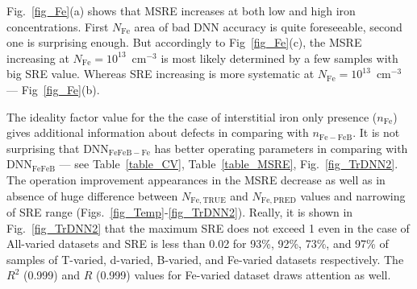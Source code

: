 \documentclass[a4paper,fleqn]{cas-sc}
\begin{document}
Fig.~\ref{fig_Fe}(a) shows that MSRE increases at both low and high iron concentrations.
First $N_\mathrm{Fe}$ area of bad DNN accuracy is quite foreseeable,
second one is surprising enough.
But accordingly to Fig~\ref{fig_Fe}(c), the MSRE increasing at $N_\mathrm{Fe}=10^{13}$~cm$^{-3}$ is most likely determined by  a few samples with big SRE value.
Whereas SRE increasing is more systematic at $N_\mathrm{Fe}=10^{13}$~cm$^{-3}$ --- Fig~\ref{fig_Fe}(b).

The ideality factor value for the the case of interstitial iron only presence ($n_\mathrm{Fe}$)
gives additional information about defects in comparing with $n_\mathrm{Fe-FeB}$.
It is not surprising that DNN$_\mathrm{FeFeB-Fe}$ has better operating parameters in comparing with
DNN$_\mathrm{FeFeB}$ --- see Table~\ref{table_CV}, Table~\ref{table_MSRE}, Fig.~\ref{fig_TrDNN2}.
The operation improvement appearances in the MSRE decrease as well as in
absence of huge difference between $N_\mathrm{Fe,TRUE}$ and $N_\mathrm{Fe,PRED}$ values
and narrowing of SRE range (Figs.~\ref{fig_Temp}-\ref{fig_TrDNN2}).
Really, it is shown in Fig.~\ref{fig_TrDNN2} that the maximum SRE does not exceed 1 even in the case of All-varied datasets
and SRE is less than 0.02 for 93\%, 92\%, 73\%, and 97\% of samples of T-varied, d-varied, B-varied, and Fe-varied datasets respectively.
The $R^2$ (0.999) and $R$ (0.999) values for Fe-varied dataset draws attention as well.
\end{document}
